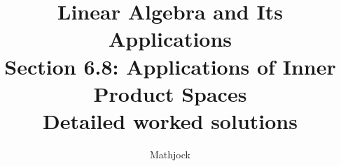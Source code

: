 
\title{\textbf{Linear Algebra and Its Applications}\\[0.3em]Section 6.8: Applications of Inner Product Spaces\\[0.3em]\large Detailed worked solutions}
\author{Mathjock}
\date{}

\maketitle
\bookinfo
\tableofcontents
\clearpage
\renewcommand{\thesection}{6.\arabic{section}}
\renewcommand{\theHsection}{6.\arabic{section}}
\setcounter{section}{7}


